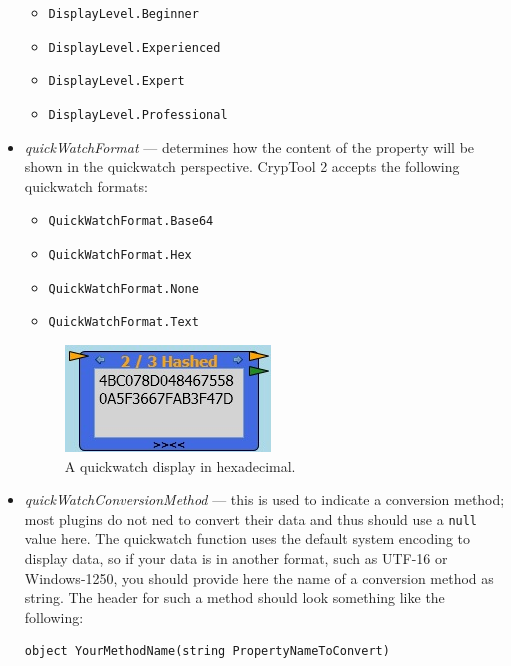 \begin{itemize}
	\begin{itemize}
		\item \texttt{DisplayLevel.Beginner}
		\item \texttt{DisplayLevel.Experienced}
		\item \texttt{DisplayLevel.Expert}
		\item \texttt{DisplayLevel.Professional}
	\end{itemize}
	
	\item \textit{quickWatchFormat} --- determines how the content of the property will be shown in the quickwatch perspective. CrypTool 2 accepts the following quickwatch formats:
	
	\begin{itemize}
		\item \texttt{QuickWatchFormat.Base64}
		\item \texttt{QuickWatchFormat.Hex}
		\item \texttt{QuickWatchFormat.None}
		\item \texttt{QuickWatchFormat.Text}
	\end{itemize}

\begin{figure}[h]
	\centering
		\includegraphics{figures/quick_watch.jpg}
	\caption{A quickwatch display in hexadecimal.}
	\label{fig:quick_watch}
\end{figure}
	
	\item \textit{quickWatchConversionMethod} --- this is used to indicate a conversion method; most plugins do not ned to convert their data and thus should use a \texttt{null} value here. The quickwatch function uses the default system encoding to display data, so if your data is in another format, such as UTF-16 or Windows-1250, you should provide here the name of a conversion method as string. The header for such a method should look something like the following:

\begin{lstlisting}
object YourMethodName(string PropertyNameToConvert)
\end{lstlisting}

\end{itemize}

